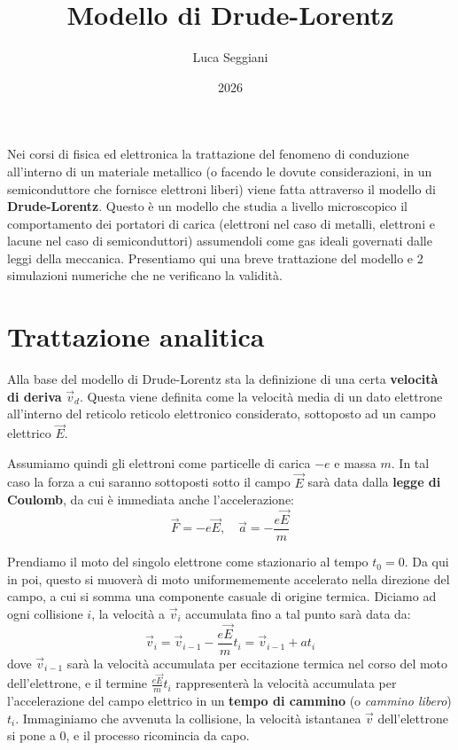 \documentclass[a4paper,11pt]{article}
\title{Modello di Drude-Lorentz}
\author{Luca Seggiani}
\date{2026}
\makeatletter
\renewcommand{\maketitle} {
	\begin{center} 
		\begin{minipage}[t]{.8\textwidth}
			\textsf{\LARGE\bfseries \@title} 
		\end{minipage}%
		\begin{minipage}[t]{.2\textwidth}
			\raggedleft \vspace{-1.65em}
			\textsf{\small \@author} \vfill
			\textsf{\small \@date}
		\end{minipage}
		\par
	\end{center}

	\thispagestyle{empty}
	\pagestyle{fancy}
}
\makeatother
\begin{document}
\pagestyle{fancy}
\thispagestyle{empty}
\renewcommand{\thispagestyle}[1]{}

\maketitle

Nei corsi di fisica ed elettronica la trattazione del fenomeno di conduzione all'interno di un materiale metallico (o facendo le dovute considerazioni, in un semiconduttore che fornisce elettroni liberi) viene fatta attraverso il modello di \textbf{Drude-Lorentz}. Questo è un modello che studia a livello microscopico il comportamento dei portatori di carica (elettroni nel caso di metalli, elettroni e lacune nel caso di semiconduttori) assumendoli come gas ideali governati dalle leggi della meccanica. Presentiamo qui una breve trattazione del modello e 2 simulazioni numeriche che ne verificano la validità.

\section{Trattazione analitica}

Alla base del modello di Drude-Lorentz sta la definizione di una certa \textbf{velocità di deriva} $\vec{v}_d$. Questa viene definita come la velocità media di un dato elettrone all'interno del reticolo reticolo elettronico considerato, sottoposto ad un campo elettrico $\vec{E}$. 

Assumiamo quindi gli elettroni come particelle di carica $-e$ e massa $m$. In tal caso la forza a cui saranno sottoposti sotto il campo $\vec{E}$ sarà data dalla \textbf{legge di Coulomb}, da cui è immediata anche l'accelerazione:
$$
\vec{F} = -e \vec{E}, \quad \vec{a} = -\frac{e \vec{E}}{m}
$$

Prendiamo il moto del singolo elettrone come stazionario al tempo $t_0 = 0$. Da qui in poi, questo si muoverà di moto uniformememente accelerato nella direzione del campo, a cui si somma una componente casuale di origine termica. Diciamo ad ogni collisione $i$, la velocità a $\vec{v}_{i}$ accumulata fino a tal punto sarà data da:
$$
\vec{v}_i = \vec{v}_{i - 1} - \frac{e \vec{E}}{m} t_i = \vec{v}_{i - 1} + a t_i
$$
dove $\vec{v}_{i - 1}$ sarà la velocità accumulata per eccitazione termica nel corso del moto dell'elettrone, e il termine $\frac{e \vec{E}}{m} t_i$ rappresenterà la velocità accumulata per l'accelerazione del campo elettrico in un \textbf{tempo di cammino} (o \textit{cammino libero}) $t_i$. Immaginiamo che avvenuta la collisione, la velocità istantanea $\vec{v}$ dell'elettrone si pone a 0, e il processo ricomincia da capo.
\end{document}
